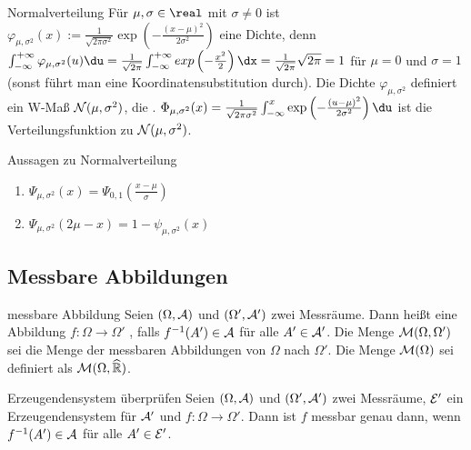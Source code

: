 \linie

\begin{Def}{Normalverteilung}
    Für $\mu, \sigma \in \real$ mit $\sigma \not= 0$ ist
    $\varphi_{\mu,\sigma^2}(x) := \frac{1}{\sqrt{2\pi\sigma^2}}
    \exp\left(-\frac{(x - \mu)^2}{2\sigma^2}\right)$ eine Dichte,
    denn $\int_{-\infty}^{+\infty} \varphi_{\mu,\sigma^2}(u)\du =
    \frac{1}{\sqrt{2\pi}} \int_{-\infty}^{+\infty} exp\left(-\frac{x^2}{2}\right)\dx =
    \frac{1}{\sqrt{2\pi}} \sqrt{2\pi} = 1$ für $\mu = 0$ und $\sigma = 1$
    (sonst führt man eine Koordinatensubstitution durch).
    Die Dichte $\varphi_{\mu,\sigma^2}$ definiert ein W-Maß $\mathcal{N}(\mu, \sigma^2)$,
    die .
    $\Phi_{\mu,\sigma^2}(x) = \frac{1}{\sqrt{2\pi\sigma^2}}
    \int_{-\infty}^x \exp\left(-\frac{(u - \mu)^2}{2\sigma^2}\right) \du$
    ist die Verteilungsfunktion zu $\mathcal{N}(\mu, \sigma^2)$.
\end{Def}

\begin{Satz}{Aussagen zu Normalverteilung}
    \begin{enumerate}
        \item
        $\Psi_{\mu,\sigma^2}(x) = \Psi_{0,1}\left(\frac{x - \mu}{\sigma}\right)$
        
        \item
        $\Psi_{\mu,\sigma^2}(2\mu - x) = 1 - \psi_{\mu,\sigma^2}(x)$
    \end{enumerate}
\end{Satz}

\pagebreak

\subsection{%
    Messbare Abbildungen%
}

\begin{Def}{messbare Abbildung}
    Seien $(\Omega, \mathcal{A})$ und $(\Omega', \mathcal{A}')$ zwei Messräume.
    Dann heißt eine Abbildung $f\colon \Omega \rightarrow \Omega'$ ,
    falls $f^{-1}(A') \in \mathcal{A}$ für alle $A' \in \mathcal{A}'$.
    Die Menge $\mathcal{M}(\Omega, \Omega')$ sei die Menge der messbaren Abbildungen von $\Omega$ nach
    $\Omega'$.
    Die Menge $\mathcal{M}(\Omega)$ sei definiert als $\mathcal{M}(\Omega, \widehat{\mathbb{R}})$.
\end{Def}

\begin{Satz}{Erzeugendensystem überprüfen}
    Seien $(\Omega, \mathcal{A})$ und $(\Omega', \mathcal{A}')$ zwei Messräume,
    $\mathcal{E}'$ ein Erzeugendensystem für $\mathcal{A}'$ und $f\colon \Omega \rightarrow \Omega'$.
    Dann ist $f$ messbar genau dann, wenn $f^{-1}(A') \in \mathcal{A}$ für alle $A' \in \mathcal{E}'$.
\end{Satz}


